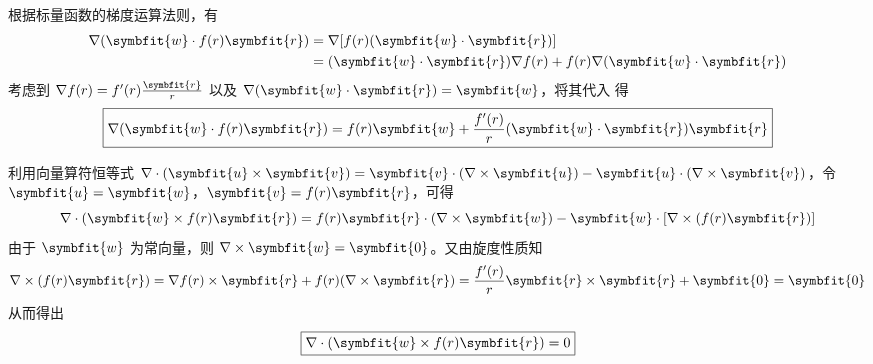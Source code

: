 \begin{solution}

    根据标量函数的梯度运算法则，有
    \begin{equation}
        \label{eq:grad-calculation}
        \begin{aligned}
            \nabla(\symbfit{w} \cdot f(r)\symbfit{r}) & = \nabla [f(r)(\symbfit{w} \cdot \symbfit{r})]                                              \\
                                                      & = (\symbfit{w} \cdot \symbfit{r}) \nabla f(r) + f(r) \nabla (\symbfit{w} \cdot \symbfit{r})
        \end{aligned}
    \end{equation}
    考虑到 $\nabla f(r) = f'(r) \frac{\symbfit{r}}{r}$ 以及 $\nabla (\symbfit{w} \cdot \symbfit{r}) = \symbfit{w}$，将其代入  得
    \begin{equation}
        \boxed{\nabla(\symbfit{w} \cdot f(r)\symbfit{r}) = f(r)\symbfit{w} + \frac{f'(r)}{r}(\symbfit{w} \cdot \symbfit{r})\symbfit{r}}
    \end{equation}


    利用向量算符恒等式 $\nabla \cdot (\symbfit{u} \times \symbfit{v}) = \symbfit{v} \cdot (\nabla \times \symbfit{u}) - \symbfit{u} \cdot (\nabla \times \symbfit{v})$，令 $\symbfit{u} = \symbfit{w}$，$\symbfit{v} = f(r)\symbfit{r}$，可得
    \begin{equation}
        \nabla \cdot (\symbfit{w} \times f(r)\symbfit{r}) = f(r)\symbfit{r} \cdot (\nabla \times \symbfit{w}) - \symbfit{w} \cdot [\nabla \times (f(r)\symbfit{r})]
    \end{equation}
    由于 $\symbfit{w}$ 为常向量，则 $\nabla \times \symbfit{w} = \symbfit{0}$。又由旋度性质知
    \begin{equation}
        \nabla \times (f(r)\symbfit{r}) = \nabla f(r) \times \symbfit{r} + f(r) (\nabla \times \symbfit{r}) = \frac{f'(r)}{r} \symbfit{r} \times \symbfit{r} + \symbfit{0} = \symbfit{0}
    \end{equation}
    从而得出
    \begin{equation}
        \boxed{\nabla \cdot (\symbfit{w} \times f(r)\symbfit{r}) = 0}
    \end{equation}



\end{solution}
